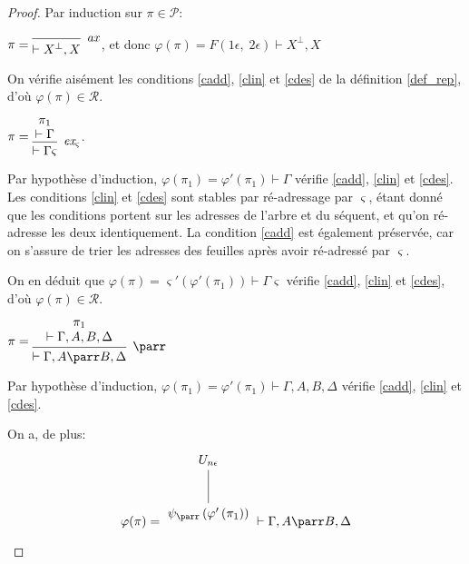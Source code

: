 \documentclass[11pt,a4paper]{article}
\theoremstyle{plain}
\theoremstyle{definition}
\theoremstyle{remark}
\newcommand*{\orth}{^\perp}
\newcommand*{\namedproofv}[2]{\hypo{#1}\infer[no rule]{1}{\vdash #2}}
\newcommand*{\axv}[1]{\infer{0}[\ensuremath{\mathit{ax}}]{\vdash #1}}
\newcommand*{\parrv}[1]{\infer{1}[\ensuremath{\parr}]{\vdash #1}}
\newcommand*{\permv}[2]{\infer{1}[\ensuremath{\textit{ex}_{#1}}]{\vdash #2}}
\newcommand*{\permapp}[2]{#2 #1}
\newcommand*{\someperm}{\varsigma}
\newcommand*{\someproof}{\pi}
\newcommand*{\proofs}{\ensuremath{\mathcal{P}}}
\newcommand*{\representations}{\ensuremath{\mathcal{R}}}
\newcommand*{\encode}{\ensuremath{\varphi}}
\begin{document}
\begin{proof}
    Par induction sur $\someproof \in \proofs$:
    \begin{description}
    \item[Axiome:] {$\someproof =
    \begin{prooftree}
        \axv{X\orth, X}
    \end{prooftree}$,
    et donc $\encode \left( \someproof \right) = F(1 \epsilon, \; 2 \epsilon) \vdash X\orth, X$

    On vérifie aisément les conditions \ref{cadd}, \ref{clin} et \ref{cdes} de la définition \ref{def_rep}, d'où $\encode \left( \someproof \right) \in \representations$.

    \item[Échange:] {$\someproof =
    \begin{prooftree}
        \namedproofv{\pi_1}{\Gamma}
        \permv{\someperm}{\permapp{\someperm}{\Gamma}}
    \end{prooftree}$.
    
    Par hypothèse d'induction, $\encode \left( \pi_1 \right) = \encode ' \left( \pi_1 \right) \vdash \Gamma$ vérifie \ref{cadd}, \ref{clin} et \ref{cdes}. Les conditions \ref{clin} et \ref{cdes} sont stables par ré-adressage par $\someperm$, étant donné que les conditions portent sur les adresses de l'arbre et du séquent, et qu'on ré-adresse les deux identiquement. La condition \ref{cadd} est également préservée, car on s'assure de trier les adresses des feuilles après avoir ré-adressé par $\someperm$.

    On en déduit que $\encode \left( \someproof \right) = \someperm' \left( \encode ' \left( \pi_1 \right) \right) \vdash \permapp{\someperm}{\Gamma}$ vérifie \ref{cadd}, \ref{clin} et \ref{cdes}, d'où $\encode \left( \someproof \right) \in \representations$.

    \item[Par:] $\someproof =
    \begin{prooftree}
      \namedproofv{\pi_1}{\Gamma, A, B, \Delta}
      \parrv{\Gamma, A \parr B, \Delta}
    \end{prooftree}$

    Par hypothèse d'induction, $\encode \left( \pi_1 \right) = \encode ' \left( \pi_1 \right) \vdash \Gamma, A, B, \Delta$ vérifie \ref{cadd}, \ref{clin} et \ref{cdes}.
    
    On a, de plus:
    \begin{equation*}
    \encode ( \someproof ) = \begin{tikzpicture}%
    [level distance=1.5cm,
    level 2/.style={sibling distance=3.5cm}]
    \node {$U_{n \epsilon}$}
        child {node {$\psi_\parr \left( \encode' \left( \pi_1 \right) \right)$}
    };
    \end{tikzpicture} \vdash \Gamma, A \parr B, \Delta
    \end{equation*}

}}
\end{description}
\end{proof}
\end{document}
